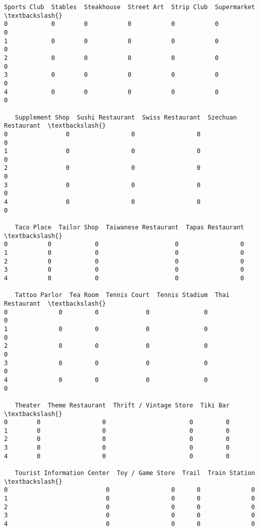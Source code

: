 \documentclass[11pt]{article}
\begin{document}
\begin{tcolorbox}[breakable, size=fbox, boxrule=.5pt, pad at break*=1mm, opacityfill=0]
\begin{Verbatim}[commandchars=\\\{\}]
   Sports Club  Stables  Steakhouse  Street Art  Strip Club  Supermarket  \textbackslash{}
0            0        0           0           0           0            0
1            0        0           0           0           0            0
2            0        0           0           0           0            0
3            0        0           0           0           0            0
4            0        0           0           0           0            0

   Supplement Shop  Sushi Restaurant  Swiss Restaurant  Szechuan Restaurant  \textbackslash{}
0                0                 0                 0                    0
1                0                 0                 0                    0
2                0                 0                 0                    0
3                0                 0                 0                    0
4                0                 0                 0                    0

   Taco Place  Tailor Shop  Taiwanese Restaurant  Tapas Restaurant  \textbackslash{}
0           0            0                     0                 0
1           0            0                     0                 0
2           0            0                     0                 0
3           0            0                     0                 0
4           0            0                     0                 0

   Tattoo Parlor  Tea Room  Tennis Court  Tennis Stadium  Thai Restaurant  \textbackslash{}
0              0         0             0               0                0
1              0         0             0               0                0
2              0         0             0               0                0
3              0         0             0               0                0
4              0         0             0               0                0

   Theater  Theme Restaurant  Thrift / Vintage Store  Tiki Bar  \textbackslash{}
0        0                 0                       0         0
1        0                 0                       0         0
2        0                 0                       0         0
3        0                 0                       0         0
4        0                 0                       0         0

   Tourist Information Center  Toy / Game Store  Trail  Train Station  \textbackslash{}
0                           0                 0      0              0
1                           0                 0      0              0
2                           0                 0      0              0
3                           0                 0      0              0
4                           0                 0      0              0


\end{Verbatim}
\end{tcolorbox}
\end{document}
